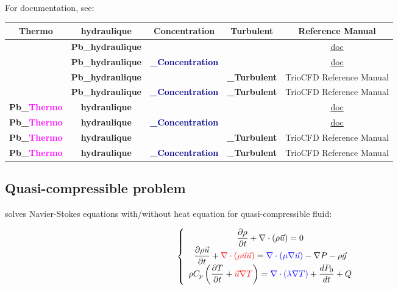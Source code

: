For documentation, see:\\

\begin{longtable}{|c|c|c|c|c|}
\hline
Thermo & hydraulique & Concentration & Turbulent & Reference Manual\tabularnewline
\hline 
\hline 
            & \textbf{Pb\_hydraulique}  &   
            &                           & \href{\REFERENCEMANUAL\#pbhydraulique}{doc} \tabularnewline 
\hline
            & \textbf{Pb\_hydraulique}  & \textbf{\textcolor{darkblue}{\_Concentration}}
            &                           & \href{\REFERENCEMANUAL\#pbhydrauliqueconcentration}{doc} \tabularnewline
\hline
            & \textbf{Pb\_hydraulique}  &   
            & \textbf{\textcolor{Greeen}{\_Turbulent}}      & TrioCFD Reference Manual \tabularnewline
\hline
            & \textbf{Pb\_hydraulique}  & \textbf{\textcolor{darkblue}{\_Concentration}}
            & \textbf{\textcolor{Greeen}{\_Turbulent}}      & TrioCFD Reference Manual \tabularnewline
\hline
\textbf{Pb\_\textcolor{magenta}{Thermo}}     & \textbf{hydraulique}  &   
                        &                       & \href{\REFERENCEMANUAL\#pbthermohydraulique}{doc} \tabularnewline
\hline
\textbf{Pb\_\textcolor{magenta}{Thermo}}     & \textbf{hydraulique}  & \textbf{\textcolor{darkblue}{\_Concentration}}
                        &                       & \href{\REFERENCEMANUAL\#pbthermohydrauliqueconcentration}{doc} \tabularnewline
\hline
\textbf{Pb\_\textcolor{magenta}{Thermo}}     & \textbf{hydraulique}  &   
                        & \textbf{\textcolor{Greeen}{\_Turbulent}}  & TrioCFD Reference Manual \tabularnewline
\hline
\textbf{Pb\_\textcolor{magenta}{Thermo}}     & \textbf{hydraulique}  & \textbf{\textcolor{darkblue}{\_Concentration}}
                        & \textbf{\textcolor{Greeen}{\_Turbulent}}  & TrioCFD Reference Manual \tabularnewline
\hline
\end{longtable}

\vspace{0.5cm}


\subsection{Quasi-compressible problem}
\trust solves Navier-Stokes equations with/without heat equation for quasi-compressible fluid:

$$
\left\{
\begin{array}{c}
\displaystyle{\frac{\partial \rho }{\partial t} + \nabla \cdot (\rho \vec u) =0 }\\
\displaystyle{ \frac{\partial \rho \vec u}{\partial t} + \textcolor{red}{\nabla \cdot (\rho \vec u \vec u)} =  \textcolor{blue}{\nabla \cdot \left(\mu \nabla \vec u \right)} - \nabla P -\rho \vec g }\\
\displaystyle{ \rho C_p \left( \frac{\partial T}{\partial t} + \textcolor{red}{\vec u \nabla T} \right) = \textcolor{blue}{\nabla \cdot \left(\lambda \nabla T\right)} + \frac{dP_0}{dt} + Q }
\end{array}
\right.
$$


